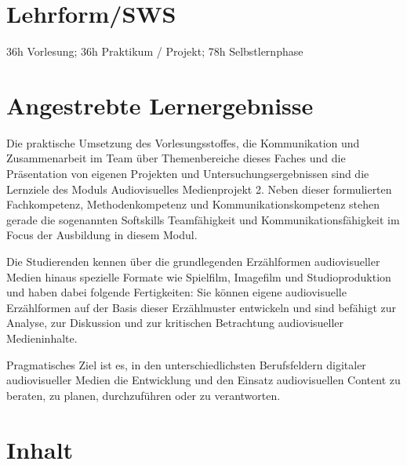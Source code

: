 \hypertarget{lehrformswspathlabelmi-2017modulbeschreibungen-bachelorba_vc-audiovisuelles-medienprojekt-2}{%
\section*{Lehrform/SWS\label{/mi-2017/modulbeschreibungen-bachelor/BA_VC-audiovisuelles-medienprojekt-2}}\label{lehrformswspathlabelmi-2017modulbeschreibungen-bachelorba_vc-audiovisuelles-medienprojekt-2}}

36h Vorlesung; 36h Praktikum / Projekt; 78h Selbstlernphase

\hypertarget{angestrebte-lernergebnissepathlabelmi-2017modulbeschreibungen-bachelorba_vc-audiovisuelles-medienprojekt-2}{%
\section*{Angestrebte
Lernergebnisse\label{/mi-2017/modulbeschreibungen-bachelor/BA_VC-audiovisuelles-medienprojekt-2}}\label{angestrebte-lernergebnissepathlabelmi-2017modulbeschreibungen-bachelorba_vc-audiovisuelles-medienprojekt-2}}

Die praktische Umsetzung des Vorlesungsstoffes, die Kommunikation und
Zusammenarbeit im Team über Themenbereiche dieses Faches und die
Präsentation von eigenen Projekten und Untersuchungsergebnissen sind die
Lernziele des Moduls Audiovisuelles Medienprojekt 2. Neben dieser
formulierten Fachkompetenz, Methodenkompetenz und
Kommunikationskompetenz stehen gerade die sogenannten Softskills
Teamfähigkeit und Kommunikationsfähigkeit im Focus der Ausbildung in
diesem Modul.

Die Studierenden kennen über die grundlegenden Erzählformen
audiovisueller Medien hinaus spezielle Formate wie Spielfilm, Imagefilm
und Studioproduktion und haben dabei folgende Fertigkeiten: Sie können
eigene audiovisuelle Erzählformen auf der Basis dieser Erzählmuster
entwickeln und sind befähigt zur Analyse, zur Diskussion und zur
kritischen Betrachtung audiovisueller Medieninhalte.

Pragmatisches Ziel ist es, in den unterschiedlichsten Berufsfeldern
digitaler audiovisueller Medien die Entwicklung und den Einsatz
audiovisuellen Content zu beraten, zu planen, durchzuführen oder zu
verantworten.

\hypertarget{inhaltpathlabelmi-2017modulbeschreibungen-bachelorba_vc-audiovisuelles-medienprojekt-2}{%
\section*{Inhalt\label{/mi-2017/modulbeschreibungen-bachelor/BA_VC-audiovisuelles-medienprojekt-2}}\label{inhaltpathlabelmi-2017modulbeschreibungen-bachelorba_vc-audiovisuelles-medienprojekt-2}}

